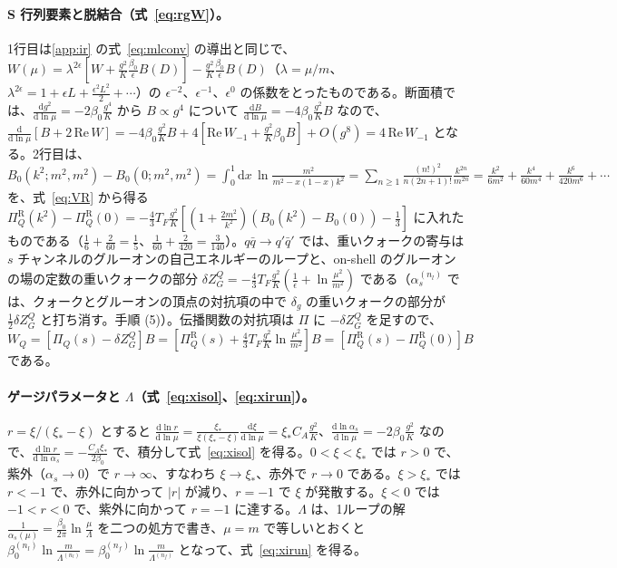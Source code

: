 \documentclass[a4paper,10pt]{ltjsarticle}
\newcommand{\dd}{\mathrm{d}}
\begin{document}
\paragraph{S 行列要素と脱結合（式~\eqref{eq:rgW}）。}1行目は\ref{app:ir} の式~\eqref{eq:mlconv} の導出と同じで、$W(\mu)=\lambda^{2\epsilon}[W+\frac{g^2}K\frac{\beta_0}\epsilon B(D)]-\frac{g^2}K\frac{\beta_0}\epsilon B(D)$（$\lambda=\mu/m$、$\lambda^{2\epsilon}=1+\epsilon L+\frac{\epsilon^2L^2}2+\cdots$）の $\epsilon^{-2}$、$\epsilon^{-1}$、$\epsilon^0$ の係数をとったものである。断面積では、$\frac{\dd g^2}{\dd\ln\mu}=-2\beta_0\frac{g^4}K$ から $B\propto g^4$ について $\frac{\dd B}{\dd\ln\mu}=-4\beta_0\frac{g^2}KB$ なので、$\frac{\dd}{\dd\ln\mu}[B+2\,\mathrm{Re}\,W]=-4\beta_0\frac{g^2}KB+4[\mathrm{Re}\,W_{-1}+\frac{g^2}K\beta_0B]+O(g^8)=4\,\mathrm{Re}\,W_{-1}$ となる。2行目は、$B_0(k^2;m^2,m^2)-B_0(0;m^2,m^2)=\int_0^1\!\dd x\,\ln\frac{m^2}{m^2-x(1-x)k^2}=\sum_{n\ge1}\frac{(n!)^2}{n(2n+1)!}\frac{k^{2n}}{m^{2n}}=\frac{k^2}{6m^2}+\frac{k^4}{60m^4}+\frac{k^6}{420m^6}+\cdots$ を、式~\eqref{eq:VR} から得る $\Pi_Q^{\mathrm R}(k^2)-\Pi_Q^{\mathrm R}(0)=-\frac43T_F\frac{g^2}K[(1+\frac{2m^2}{k^2})(B_0(k^2)-B_0(0))-\frac13]$ に入れたものである（$\frac16+\frac2{60}=\frac15$、$\frac1{60}+\frac2{420}=\frac3{140}$）。$q\bar q\to q'\bar q'$ では、重いクォークの寄与は $s$ チャンネルのグルーオンの自己エネルギーのループと、on-shell のグルーオンの場の定数の重いクォークの部分 $\delta Z_G^Q=-\frac43T_F\frac{g^2}K(\frac1\epsilon+\ln\frac{\mu^2}{m^2})$ である（$\alpha_s^{(n_l)}$ では、クォークとグルーオンの頂点の対抗項の中で $\delta_g$ の重いクォークの部分が $\frac12\delta Z_G^Q$ と打ち消す。手順 (5)）。伝播関数の対抗項は $\Pi$ に $-\delta Z_G^Q$ を足すので、$W_Q=[\Pi_Q(s)-\delta Z_G^Q]B=[\Pi_Q^{\mathrm R}(s)+\frac43T_F\frac{g^2}K\ln\frac{\mu^2}{m^2}]B=[\Pi_Q^{\mathrm R}(s)-\Pi_Q^{\mathrm R}(0)]B$ である。

\paragraph{ゲージパラメータと $\Lambda$（式~\eqref{eq:xisol}、\eqref{eq:xirun}）。}$r=\xi/(\xi_*-\xi)$ とすると $\frac{\dd\ln r}{\dd\ln\mu}=\frac{\xi_*}{\xi(\xi_*-\xi)}\frac{\dd\xi}{\dd\ln\mu}=\xi_*C_A\frac{g^2}K$、$\frac{\dd\ln\alpha_s}{\dd\ln\mu}=-2\beta_0\frac{g^2}K$ なので、$\frac{\dd\ln r}{\dd\ln\alpha_s}=-\frac{C_A\xi_*}{2\beta_0}$ で、積分して式~\eqref{eq:xisol} を得る。$0<\xi<\xi_*$ では $r>0$ で、紫外（$\alpha_s\to0$）で $r\to\infty$、すなわち $\xi\to\xi_*$、赤外で $r\to0$ である。$\xi>\xi_*$ では $r<-1$ で、赤外に向かって $|r|$ が減り、$r=-1$ で $\xi$ が発散する。$\xi<0$ では $-1<r<0$ で、紫外に向かって $r=-1$ に達する。$\Lambda$ は、1ループの解 $\frac1{\alpha_s(\mu)}=\frac{\beta_0}{2\pi}\ln\frac\mu\Lambda$ を二つの処方で書き、$\mu=m$ で等しいとおくと $\beta_0^{(n_l)}\ln\frac m{\Lambda^{(n_l)}}=\beta_0^{(n_f)}\ln\frac m{\Lambda^{(n_f)}}$ となって、式~\eqref{eq:xirun} を得る。
\end{document}
